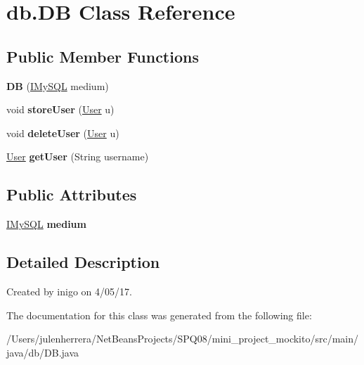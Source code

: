 \hypertarget{classdb_1_1_d_b}{}\section{db.\+DB Class Reference}
\label{classdb_1_1_d_b}
\subsection*{Public Member Functions}
\begin{DoxyCompactItemize}
\item 
\mbox{\label{classdb_1_1_d_b_ab80c46689f0d91d97492f0acf3091aa0}} 
{\bfseries DB} (\hyperlink{interfacedb_1_1_i_my_s_q_l}{I\+My\+S\+QL} medium)
\item 
\mbox{\label{classdb_1_1_d_b_a78be4f0902375e09d2aba0e4e338e82c}} 
void {\bfseries store\+User} (\hyperlink{classentities_1_1_user}{User} u)
\item 
\mbox{\label{classdb_1_1_d_b_a5af5ec1ba5e7e8000fa669e18826efc7}} 
void {\bfseries delete\+User} (\hyperlink{classentities_1_1_user}{User} u)
\item 
\mbox{\label{classdb_1_1_d_b_ab41b4f3cf90d97714f78307f548ad678}} 
\hyperlink{classentities_1_1_user}{User} {\bfseries get\+User} (String username)
\end{DoxyCompactItemize}
\subsection*{Public Attributes}
\begin{DoxyCompactItemize}
\item 
\mbox{\label{classdb_1_1_d_b_ae75b89d7880417ea409f74231bb98674}} 
\hyperlink{interfacedb_1_1_i_my_s_q_l}{I\+My\+S\+QL} {\bfseries medium}
\end{DoxyCompactItemize}


\subsection{Detailed Description}
Created by inigo on 4/05/17. 

The documentation for this class was generated from the following file\+:\begin{DoxyCompactItemize}
\item 
/\+Users/julenherrera/\+Net\+Beans\+Projects/\+S\+P\+Q08/mini\+\_\+project\+\_\+mockito/src/main/java/db/D\+B.\+java\end{DoxyCompactItemize}
